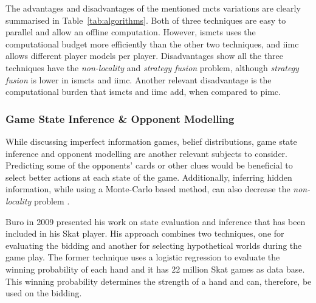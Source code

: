 The advantages and disadvantages of the mentioned \gls{mcts} variations are clearly summarised in Table~\ref{tab:algorithms}.
Both of three techniques are easy to parallel and allow an offline computation. However, \gls{ismcts} uses the computational budget more efficiently than the other two techniques, and \gls{iimc} allows different player models per player.
Disadvantages show all the three techniques have the \emph{non-locality} and \emph{strategy fusion} problem, although \emph{strategy fusion} is lower in \gls{ismcts} and \gls{iimc}.
Another relevant disadvantage is the computational burden that \gls{ismcts} and \gls{iimc} add, when compared to \gls{pimc}.







\subsubsection{Game State Inference \& Opponent Modelling}


While discussing imperfect information games, belief distributions, game state inference and opponent modelling are another relevant subjects to consider.
Predicting some of the opponents' cards or other clues would be beneficial to select better actions at each state of the game. Additionally, inferring hidden information, while using a Monte-Carlo based method, can also decrease the \emph{non-locality} problem \cite{Cowling2012}.


Buro in 2009 \cite{Buro} presented his work on state evaluation and inference that has been included in his Skat player.
His approach combines two techniques, one for evaluating the bidding and another for selecting hypothetical worlds during the game play.
The former technique uses a logistic regression to evaluate the winning probability of each hand and it has 22 million Skat games as data base.
This winning probability determines the strength of a hand and can, therefore, be used on the bidding.


